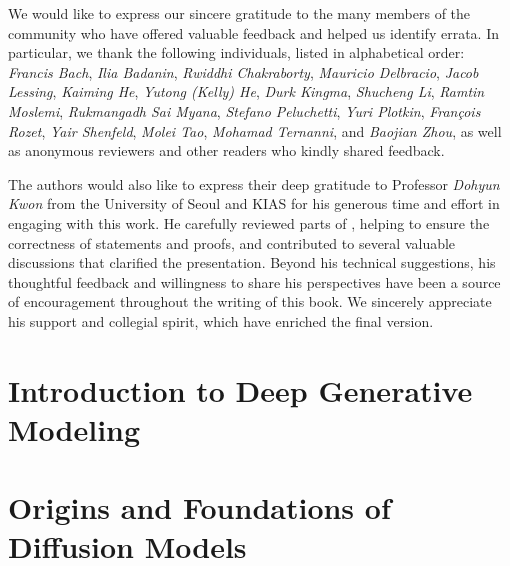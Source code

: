 \documentclass[examplefnt,biber]{nowfnt-arxiv} %
\newtheorem[M]{question}{\sffamily\bfseries Question}[section]
\begin{document}
\begin{acknowledgements}

We would like to express our sincere gratitude to the many members of the community who have offered valuable feedback and helped us identify errata. In particular, we thank the following individuals, listed in alphabetical order: \emph{Francis Bach}, \emph{Ilia Badanin}, \emph{Rwiddhi Chakraborty}, \emph{Mauricio Delbracio}, \emph{Jacob Lessing}, \emph{Kaiming He}, \emph{Yutong (Kelly) He}, \emph{Durk Kingma}, \emph{Shucheng Li}, \emph{Ramtin Moslemi}, \emph{Rukmangadh Sai Myana}, \emph{Stefano Peluchetti}, \emph{Yuri Plotkin}, \emph{François Rozet}, \emph{Yair Shenfeld}, \emph{Molei Tao}, \emph{Mohamad Ternanni}, and \emph{Baojian Zhou}, as well as anonymous reviewers and other readers who kindly shared feedback.

The authors would also like to express their deep gratitude to Professor \emph{Dohyun Kwon} from the University of Seoul and KIAS for his generous time and effort in engaging with this work. He carefully reviewed parts of , helping to ensure the correctness of statements and proofs, and contributed to several valuable discussions that clarified the presentation. Beyond his technical suggestions, his thoughtful feedback and willingness to share his perspectives have been a source of encouragement throughout the writing of this book. We sincerely appreciate his support and collegial spirit, which have enriched the final version.






\end{acknowledgements}



\part{Introduction to Deep Generative Modeling}

\part{Origins and Foundations of Diffusion Models}







\end{document}
